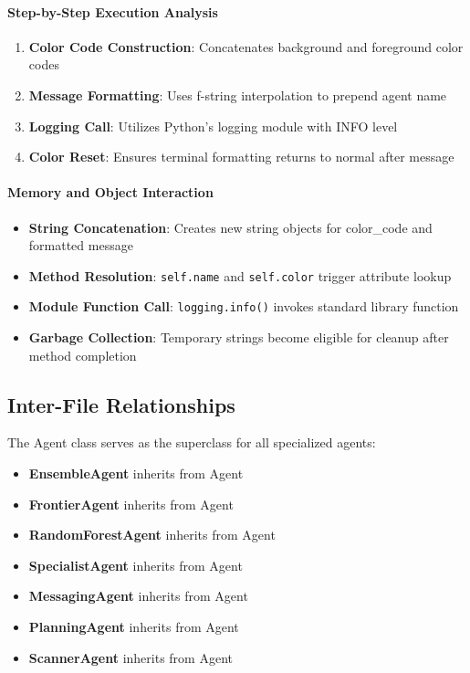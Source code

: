 \paragraph{Step-by-Step Execution Analysis}
\begin{enumerate}
\item \textbf{Color Code Construction}: Concatenates background and foreground color codes
\item \textbf{Message Formatting}: Uses f-string interpolation to prepend agent name
\item \textbf{Logging Call}: Utilizes Python's logging module with INFO level
\item \textbf{Color Reset}: Ensures terminal formatting returns to normal after message
\end{enumerate}

\paragraph{Memory and Object Interaction}
\begin{itemize}
\item \textbf{String Concatenation}: Creates new string objects for color\_code and formatted message
\item \textbf{Method Resolution}: \texttt{self.name} and \texttt{self.color} trigger attribute lookup
\item \textbf{Module Function Call}: \texttt{logging.info()} invokes standard library function
\item \textbf{Garbage Collection}: Temporary strings become eligible for cleanup after method completion
\end{itemize}

\subsection{Inter-File Relationships}

The Agent class serves as the superclass for all specialized agents:
\begin{itemize}
\item \textbf{EnsembleAgent} inherits from Agent
\item \textbf{FrontierAgent} inherits from Agent  
\item \textbf{RandomForestAgent} inherits from Agent
\item \textbf{SpecialistAgent} inherits from Agent
\item \textbf{MessagingAgent} inherits from Agent
\item \textbf{PlanningAgent} inherits from Agent
\item \textbf{ScannerAgent} inherits from Agent
\end{itemize}

